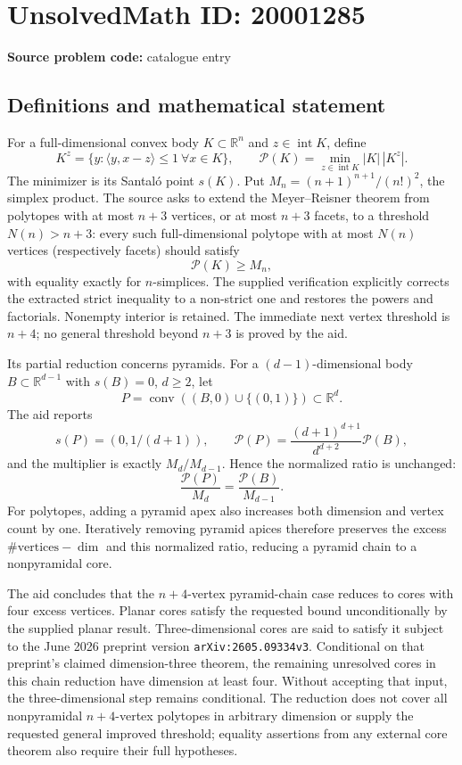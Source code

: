 \documentclass[11pt]{article}
\newcommand{\R}{\mathbb{R}}
\begin{document}
\section*{UnsolvedMath ID: 20001285}
\textbf{Source problem code:} catalogue entry
\subsection{Definitions and mathematical statement}
For a full-dimensional convex body \(K\subset\R^n\) and \(z\in\operatorname{int}K\), define
\[
 K^z=\{y:\langle y,x-z\rangle\le1\ \forall x\in K\},\qquad
 \mathcal P(K)=\min_{z\in\operatorname{int}K}|K|\,|K^z|.
\]
The minimizer is its Santal\'o point \(s(K)\). Put \(M_n=(n+1)^{n+1}/(n!)^2\), the simplex product. The source asks to extend the Meyer--Reisner theorem from polytopes with at most \(n+3\) vertices, or at most \(n+3\) facets, to a threshold \(N(n)>n+3\): every such full-dimensional polytope with at most \(N(n)\) vertices (respectively facets) should satisfy
\[
 \mathcal P(K)\ge M_n,
\]
with equality exactly for \(n\)-simplices. The supplied verification explicitly corrects the extracted strict inequality to a non-strict one and restores the powers and factorials. Nonempty interior is retained. The immediate next vertex threshold is \(n+4\); no general threshold beyond \(n+3\) is proved by the aid.

Its partial reduction concerns pyramids. For a \((d-1)\)-dimensional body \(B\subset\R^{d-1}\) with \(s(B)=0\), \(d\ge2\), let
\[
 P=\operatorname{conv}((B,0)\cup\{(0,1)\})\subset\R^d.
\]
The aid reports
\[
 s(P)=(0,1/(d+1)),\qquad
 \mathcal P(P)=\frac{(d+1)^{d+1}}{d^{d+2}}\mathcal P(B),
\]
and the multiplier is exactly \(M_d/M_{d-1}\). Hence the normalized ratio is unchanged:
\[
 \frac{\mathcal P(P)}{M_d}=\frac{\mathcal P(B)}{M_{d-1}}.
\]
For polytopes, adding a pyramid apex also increases both dimension and vertex count by one. Iteratively removing pyramid apices therefore preserves the excess \(\#\text{vertices}-\dim\) and this normalized ratio, reducing a pyramid chain to a nonpyramidal core.

The aid concludes that the \(n+4\)-vertex pyramid-chain case reduces to cores with four excess vertices. Planar cores satisfy the requested bound unconditionally by the supplied planar result. Three-dimensional cores are said to satisfy it subject to the June 2026 preprint version \texttt{arXiv:2605.09334v3}. Conditional on that preprint's claimed dimension-three theorem, the remaining unresolved cores in this chain reduction have dimension at least four. Without accepting that input, the three-dimensional step remains conditional. The reduction does not cover all nonpyramidal \(n+4\)-vertex polytopes in arbitrary dimension or supply the requested general improved threshold; equality assertions from any external core theorem also require their full hypotheses.
\end{document}
